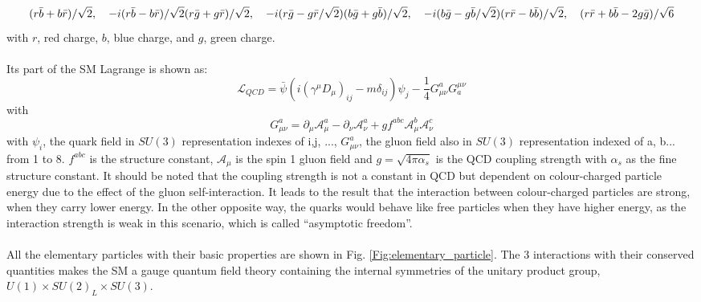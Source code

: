 \begin{equation}
         (r\bar{b}+b\bar{r})/\sqrt{2}, \quad -i(r\bar{b}-b\bar{r})/\sqrt{2}  \\
         (r\bar{g}+g\bar{r})/\sqrt{2}, \quad -i(r\bar{g}-g\bar{r}/\sqrt{2})  \\
          (b\bar{g}+g\bar{b})/\sqrt{2},\quad -i(b\bar{g}-g\bar{b}/\sqrt{2})   \\
          (r\bar{r}-b\bar{b})/\sqrt{2},\quad  (r\bar{r}+b\bar{b}-2g\bar{g})/\sqrt{6}
\end{equation}
with $r$, red charge, $b$, blue charge, and $g$, green charge.
\\
\\Its part of the SM Lagrange is shown as:
\begin{equation}
\mathcal{L}_{QCD}=\bar{\psi}(i(\gamma^\mu D_\mu)_{ij}-m\delta_{ij})\psi_j-\frac{1}{4}G^a_{\mu\nu}G_a^{\mu\nu} 
\end{equation}
with
\begin{equation}
G^a_{\mu\nu}=\partial_\mu\mathcal{A}^a_\mu-\partial_\nu\mathcal{A}^a_\nu+gf^{abc}\mathcal{A}^b_\mu\mathcal{A}^c_\nu 
\end{equation}
with $\psi_i$, the quark field in $SU(3)$ representation indexes of i,j, ..., $G^a_{\mu\nu}$, the gluon field also in $SU(3)$ representation indexed of a, b... from 1 to 8. $f^{abc}$ is the structure constant, $\mathcal{A}_\mu$ is the spin 1 gluon field and $g = \sqrt{4\pi\alpha_s}$ is the QCD coupling strength with $\alpha_s$ as the fine structure constant. It should be noted that the coupling strength is not a constant in QCD but dependent on colour-charged particle energy due to the effect of the gluon self-interaction. It leads to the result that the interaction between colour-charged particles are strong, when they carry lower energy. In the other opposite way, the quarks would behave like free particles when they have higher energy, as the interaction strength is weak in this scenario, which is called ``asymptotic freedom''.
\\
\\All the elementary particles with their basic properties are shown in Fig. \ref{Fig:elementary_particle}. The 3 interactions with their conserved quantities makes the SM a gauge quantum field theory containing the internal symmetries of the unitary product group, $U(1) \times SU(2)_L \times SU(3)$.

